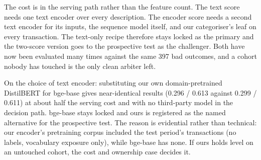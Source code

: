 The cost is in the serving path rather than the feature count. The text score needs one text encoder over every description. The encoder score needs a second text encoder for its inputs, the sequence model itself, and our categoriser's leaf on every transaction. The text-only recipe therefore stays locked as the primary and the two-score version goes to the prospective test as the challenger. Both have now been evaluated many times against the same 397 bad outcomes, and a cohort nobody has touched is the only clean arbiter left.

On the choice of text encoder: substituting our own domain-pretrained DistilBERT for bge-base gives near-identical results (0.296 / 0.613 against 0.299 / 0.611) at about half the serving cost and with no third-party model in the decision path. bge-base stays locked and ours is registered as the named alternative for the prospective test. The reason is evidential rather than technical: our encoder's pretraining corpus included the test period's transactions (no labels, vocabulary exposure only), while bge-base has none. If ours holds level on an untouched cohort, the cost and ownership case decides it.
